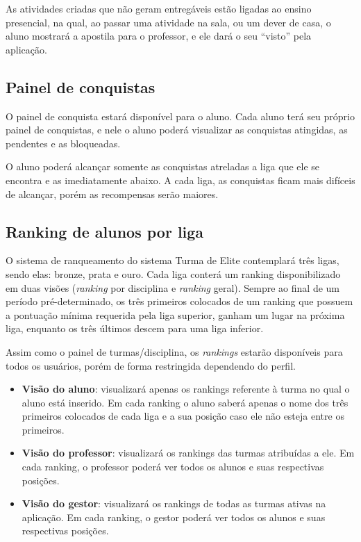 As atividades criadas que não geram entregáveis estão ligadas ao ensino presencial, na qual, ao passar uma atividade na sala, ou um dever de casa, o aluno mostrará a apostila para o professor, e ele dará o seu “visto” pela aplicação. 

\subsection{Painel de conquistas}
O painel de conquista estará disponível para o aluno. Cada aluno terá seu próprio painel de conquistas, e nele o aluno poderá visualizar as conquistas atingidas, as pendentes e as bloqueadas. 


O aluno poderá alcançar somente as conquistas atreladas a liga que ele se encontra e as imediatamente abaixo. A cada liga, as conquistas ficam mais difíceis de alcançar, porém as recompensas serão maiores. 
\subsection{Ranking de alunos por liga}
O sistema de ranqueamento do sistema Turma de Elite contemplará três ligas, sendo elas: bronze, prata e ouro. Cada liga conterá um ranking disponibilizado em duas visões (\textit{\gls{ranking}} por disciplina e \textit{\gls{ranking}} geral). Sempre ao final de um período pré-determinado, os três primeiros colocados de um ranking que possuem a pontuação mínima requerida pela liga superior, ganham um lugar na próxima liga, enquanto os três últimos descem para uma liga inferior.


Assim como o painel de turmas/disciplina, os \textit{\glspl{ranking}} estarão disponíveis para todos os usuários, porém de forma restringida dependendo do perfil.
\begin{itemize}
\item \textbf{Visão do aluno}: visualizará apenas os \glspl{ranking} referente à turma no qual o aluno está inserido. Em cada ranking o aluno saberá apenas o nome dos três primeiros colocados de cada liga e a sua posição caso ele não esteja entre os primeiros.
\item \textbf{Visão do professor}: visualizará os \glspl{ranking} das turmas atribuídas a ele. Em cada ranking, o professor poderá ver todos os alunos e suas respectivas posições.
\item \textbf{Visão do gestor}: visualizará os rankings de todas as turmas ativas na aplicação. Em cada \gls{ranking}, o gestor poderá ver todos os alunos e suas respectivas posições.
\end{itemize}

